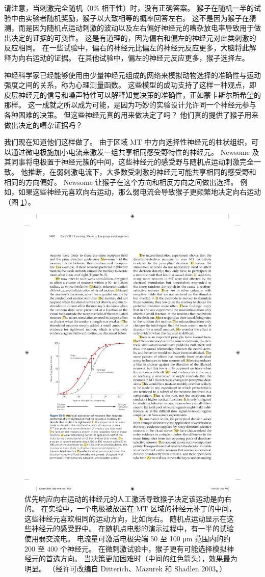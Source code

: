 请注意，当刺激完全随机（0\% 相干性）时，没有正确答案。 猴子在随机一半的试验中由实验者随机奖励，猴子以大致相等的概率回答左右。 这不是因为猴子在猜测，而是因为随机点运动刺激的波动以及左右偏好神经元的嘈杂放电率导致用于做出决定的证据的可变性。 这是有道理的，因为偏右和偏左的神经元对此类刺激的反应相同。 在一些试验中，偏右的神经元比偏左的神经元反应更多，大脑将此解释为向右运动的证据。 在其他试验中，偏左的神经元反应更多，猴子选择左。

神经科学家已经能够使用由少量神经元组成的网络来模拟动物选择的准确性与运动强度之间的关系，称为心理测量函数。 这些模型的成功支持了这样一种观点，即皮层神经元的信号和噪声特性可以解释知觉决策的准确性，正如蒙卡斯尔所希望的那样。 这一成就之所以成为可能，是因为巧妙的实验设计允许同一个神经元参与各种困难的决策。 但这些神经元真的用来做决定了吗？ 他们真的提供了猴子用来做出决定的嘈杂证据吗？

我们现在知道他们这样做了。 由于区域 MT 中方向选择性神经元的柱状组织，可以通过微电极施加小电流来激发一组共享相同感受野特性的神经元。 Newsome 及其同事将电极置于神经元簇的中间，这些神经元的感受野与随机点运动刺激完全一致。 他推断，在弱刺激电流下，大多数受刺激的神经元可能共享相同的感受野和相同的方向偏好。 Newsome 让猴子在这个方向和相反方向之间做出选择。 例如，如果这些神经元喜欢向右运动，那么弱电流会导致猴子更频繁地决定向右运动（图 \ref{fig:56_5}）。

\begin{figure}[htbp]
	\centering
	\includegraphics[width=0.5\linewidth]{chap56/fig_56_5}
	\caption{优先响应向右运动的神经元的人工激活导致猴子决定该运动是向右的。 在实验中，一个电极被放置在 MT 区域的神经元补丁的中间，这些神经元喜欢相同的运动方向，比如向右。 随机点运动显示在这些神经元的感受野中。 在随机点电影的演示过程中，有一半的试验使用弱交流电。 电流量可激活电极尖端 50 至 100 μm 范围内的约 200 至 400 个神经元。 在微刺激试验中，猴子更有可能选择模拟神经元的首选方向。 当决策更加困难时（中间的红色箭头），效果最为明显。 （经许可改编自 Ditterich、Mazurek 和 Shadlen 2003。）}
	\label{fig:56_5}
\end{figure}


